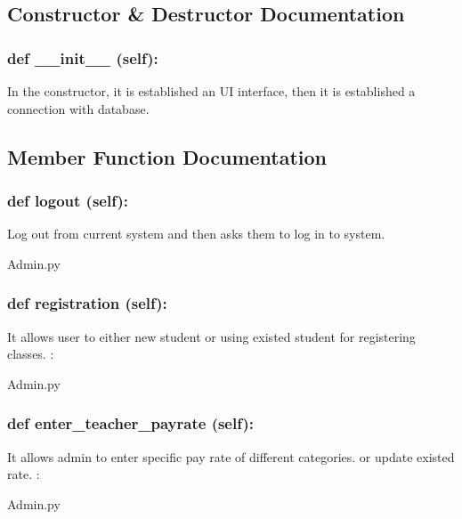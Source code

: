 \subsection{Constructor \& Destructor Documentation}
\hypertarget{class_poly_aa3def076b74bed67904976ad4f9fe9b1}{
\subsubsection[{def __init__ (self):}]{\setlength{\rightskip}{0pt plus 5cm}def {\_\_init\_\_} (self): 
}}

In the constructor, it is established an UI interface, then it is  established a connection with database.

\subsection{Member Function Documentation}

\hypertarget{class_poly_a14a7ad77ce612b0c54f531d307ee4b39}{
\subsubsection[{def logout(self):}]{\setlength{\rightskip}{0pt plus 5cm}def {logout} (self):}}\label{class_poly_a14a7ad77ce612b0c54f531d307ee4b39}
Log out from current system and then asks them to log in to system.
\begin{DoxyCompactItemize}
\item 
Admin.\-py\end{DoxyCompactItemize}

\hypertarget{class_poly_a14a7ad77ce612b0c54f531d307ee4b39}{
\subsubsection[{def registration(self):}]{\setlength{\rightskip}{0pt plus 5cm}def {registration} (self):}}\label{class_poly_a14a7ad77ce612b0c54f531d307ee4b39}
It allows user to either new student or using existed student for registering classes. 
:\begin{DoxyCompactItemize}
\item 
Admin.\-py\end{DoxyCompactItemize}

\hypertarget{class_poly_a14a7ad77ce612b0c54f531d307ee4b39}{
\subsubsection[{def enter_teacher_payrate(self):}]{\setlength{\rightskip}{0pt plus 5cm}def {enter\_teacher\_payrate} (self):}}\label{class_poly_a14a7ad77ce612b0c54f531d307ee4b39}
It allows admin to enter specific pay rate of different categories. or update existed rate.
:\begin{DoxyCompactItemize}
\item 
Admin.\-py\end{DoxyCompactItemize}


